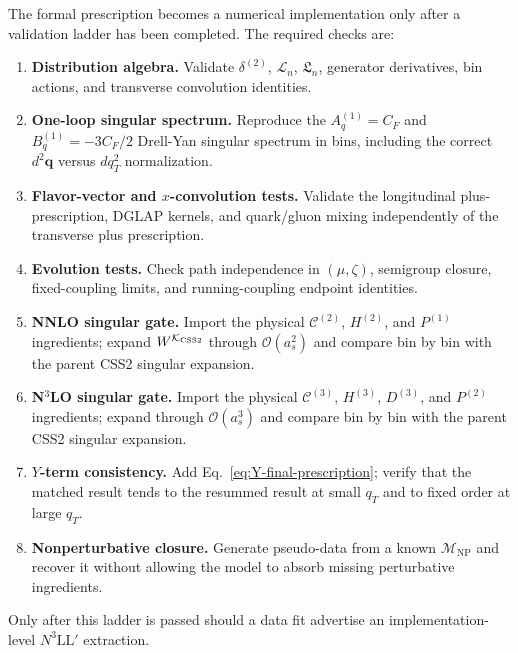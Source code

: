 \documentclass[11pt]{article}
\newcommand{\bq}{\bm{q}}
\newcommand{\deltaT}{\delta^{(2)}}
\newcommand{\order}[1]{\mathcal{O}\!\left(#1\right)}
\newcommand{\NP}{\mathrm{NP}}
\newcommand{\KCSS}{\mathcal K_{\rm CSS2}}
\begin{document}
The formal prescription becomes a numerical implementation only after a validation ladder
has been completed.  The required checks are:
\begin{enumerate}
  \item \textbf{Distribution algebra.} Validate $\deltaT$, $\mathcal L_n$, $\mathfrak L_n$,
  generator derivatives, bin actions, and transverse convolution identities.

  \item \textbf{One-loop singular spectrum.} Reproduce the $A_q^{(1)}=C_F$ and
  $B_q^{(1)}=-3C_F/2$ Drell-Yan singular spectrum in bins, including the correct
  $d^2\bq$ versus $dq_T^2$ normalization.

  \item \textbf{Flavor-vector and $x$-convolution tests.} Validate the longitudinal
  plus-prescription, DGLAP kernels, and quark/gluon mixing independently of the transverse
  plus prescription.

  \item \textbf{Evolution tests.} Check path independence in $(\mu,\zeta)$, semigroup
  closure, fixed-coupling limits, and running-coupling endpoint identities.

  \item \textbf{NNLO singular gate.} Import the physical $\mathcal C^{(2)}$, $H^{(2)}$,
  and $P^{(1)}$ ingredients; expand $W^{\KCSS}$ through $\order{a_s^2}$ and compare bin by
  bin with the parent CSS2 singular expansion.

  \item \textbf{N$^3$LO singular gate.} Import the physical $\mathcal C^{(3)}$, $H^{(3)}$,
  $D^{(3)}$, and $P^{(2)}$ ingredients; expand through $\order{a_s^3}$ and compare bin by
  bin with the parent CSS2 singular expansion.

  \item \textbf{$Y$-term consistency.} Add Eq.~\eqref{eq:Y-final-prescription}; verify
  that the matched result tends to the resummed result at small $q_T$ and to fixed order
  at large $q_T$.

  \item \textbf{Nonperturbative closure.} Generate pseudo-data from a known
  $\mathcal M_{\NP}$ and recover it without allowing the model to absorb missing
  perturbative ingredients.
\end{enumerate}

Only after this ladder is passed should a data fit advertise an implementation-level
$N^3\mathrm{LL}'$ extraction.
\end{document}
